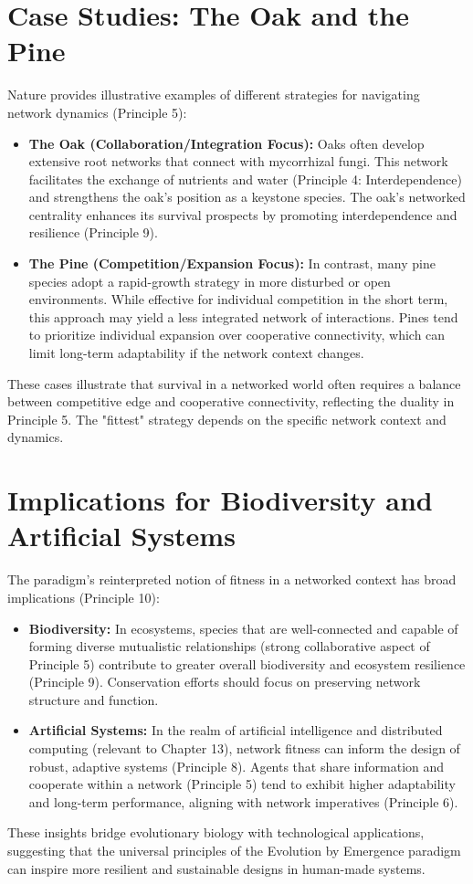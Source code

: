 \documentclass[12pt,openany]{book}
\begin{document}
\section{Case Studies: The Oak and the Pine}
Nature provides illustrative examples of different strategies for navigating network dynamics (Principle 5):
\begin{itemize}
    \item \textbf{The Oak (Collaboration/Integration Focus):} Oaks often develop extensive root networks that connect with mycorrhizal fungi. This network facilitates the exchange of nutrients and water (Principle 4: Interdependence) and strengthens the oak's position as a keystone species. The oak’s networked centrality enhances its survival prospects by promoting interdependence and resilience (Principle 9).
    \item \textbf{The Pine (Competition/Expansion Focus):} In contrast, many pine species adopt a rapid-growth strategy in more disturbed or open environments. While effective for individual competition in the short term, this approach may yield a less integrated network of interactions. Pines tend to prioritize individual expansion over cooperative connectivity, which can limit long-term adaptability if the network context changes.
\end{itemize}
These cases illustrate that survival in a networked world often requires a balance between competitive edge and cooperative connectivity, reflecting the duality in Principle 5. The "fittest" strategy depends on the specific network context and dynamics. %

\section{Implications for Biodiversity and Artificial Systems}
The paradigm's reinterpreted notion of fitness in a networked context has broad implications (Principle 10):
\begin{itemize}
    \item \textbf{Biodiversity:} In ecosystems, species that are well-connected and capable of forming diverse mutualistic relationships (strong collaborative aspect of Principle 5) contribute to greater overall biodiversity and ecosystem resilience (Principle 9). Conservation efforts should focus on preserving network structure and function.
    \item \textbf{Artificial Systems:} In the realm of artificial intelligence and distributed computing (relevant to Chapter 13), network fitness can inform the design of robust, adaptive systems (Principle 8). Agents that share information and cooperate within a network (Principle 5) tend to exhibit higher adaptability and long-term performance, aligning with network imperatives (Principle 6).
\end{itemize}
These insights bridge evolutionary biology with technological applications, suggesting that the universal principles of the Evolution by Emergence paradigm can inspire more resilient and sustainable designs in human-made systems. %
\end{document}
